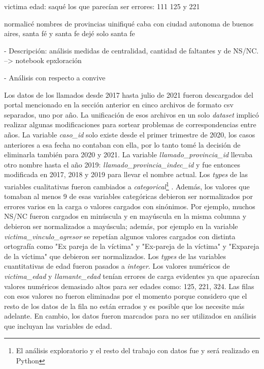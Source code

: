 \documentclass[10pt, spanish]{article}
\begin{document}
victima edad: saqué los que parecían ser errores:  111 125 y 221

normalicé nombres de provincias uinifiqué caba con ciudad autonoma de buenos aires, santa fé y santa fe dejé solo santa fe




- Descripción: análisis medidas de centralidad, cantidad de faltantes y de NS/NC. --> notebook epxloración




- Análisis con respecto a convive





Los datos de los llamados desde 2017 hasta julio de 2021 fueron descargados del portal mencionado en la sección anterior en cinco archivos de formato csv separados, uno por año. La unificación de esos archivos en un solo \textit{dataset} implicó realizar algunas modificaciones para sortear problemas de correspondencias entre años. La variable \textit{caso\_id} solo existe desde el primer trimestre de 2020, los casos anteriores a esa fecha no contaban con ella, por lo tanto tomé la decisión de eliminarla también para 2020 y 2021. La variable \textit{llamado\_provincia\_id} llevaba otro nombre hasta el año 2019: \textit{llamado\_provincia\_indec\_id} y fue entonces modificada en 2017, 2018 y 2019 para llevar el nombre actual. 
\newline
Los \textit{types} de las variables cualitativas fueron cambiados a \textit{categorical}\footnote{El análisis exploratorio y el resto del trabajo con datos fue y será realizado en Python} . Además, los valores que tomaban al menos 9 de esas variables categóricas debieron ser normalizados por errores varios en la carga o valores cargados con sinónimos. Por ejemplo, muchos NS/NC fueron cargados en minúscula y en mayúscula en la misma columna y debieron ser normalizados a mayúscula; además, por ejemplo en la variable \textit{victima\_vinculo\_agresor} se repetían algunos valores cargados con distinta ortografía como "Ex pareja de la víctima" y "Ex-pareja de la víctima" y "Expareja de la víctima" que debieron ser normalizados.
Los \textit{types} de las variables cuantitativas de edad fueron pasados a \textit{integer}. Los valores numéricos de \textit{victima\_edad} y \textit{llamante\_edad} tenían errores de carga evidentes ya que aparecían valores numéricos demasiado altos para ser edades como: 125, 221, 324. Las filas con esos valores no fueron eliminadas por el momento porque considero que el resto de los datos de la fila no están errados y es posible que los necesite más adelante. En cambio, los datos fueron marcados para no ser utilizados en análisis que incluyan las variables de edad.
\end{document}
